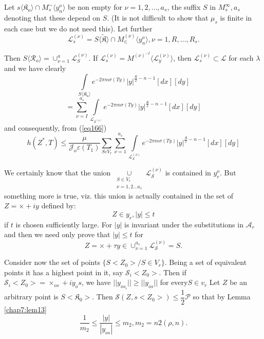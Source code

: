Let $s\langle\mathfrak{K}_o\rangle \cap M^{\sim}_s
\langle y_n^o\rangle$ be non empty for  $\nu = 1, 2, \ldots ,
a_s$, the suffix $S$ in $M_s^{\infty}, a_s$ denoting that these depend
on $S$. (It is not difficult to show that $\mu_s$ is finite in each
case but we do not need this). Let further 
$$
\mathscr{L}_s^{(\nu)} = S \langle \tilde{\mathfrak{K}} \rangle \cap
M_\in^{(\nu)} \langle y_n^o \rangle, \nu = 1, R, \ldots , R_s. 
$$

Then $S \langle \mathscr{R}_o \rangle = \cup^{a}_{\nu = 1}
\mathscr{L}^{(\nu)}_S$. If $\mathscr{L}_s^{(\nu)} = M^{(\nu)^{-I}}
\langle \mathscr{L}_y^{(\nu)}\rangle$, then $\mathscr{L}^{(\nu)}_s
\subset \mathscr{L}$ for each $\lambda$ and we have clearly 
$$
\int\limits_{S\langle \mathfrak{K}_o \rangle} e^{-2 \pi m \sigma (Ty)}
|y|^{\frac{\mathfrak{K}}{2}-n-1} [dx][dy] 
$$
$$
= \sum_{\nu = I }^{a_s} \int\limits_{\mathscr{L}_{\mathscr{S}^{(\nu)}}}
e^{-2 \pi m \sigma (Ty)} |y|^{\frac{\mathfrak{K}}{2}-n-1} [dx][dy] 
$$\pageoriginale 
and consequently, from (\ref{eq166})
\begin{equation*}
h (Z^*, T) \le \frac{\mu}{\mathcal{J}_o \varepsilon(T_1)} \sum_{S
  \varepsilon V_r} \sum_{\nu = 1}^{a_s}
\int\limits_{\mathscr{L}_{\mathscr{S}}^{(\nu)}} e^{-2 \pi m \sigma (Ty)}
|y|^{\frac{\mathfrak{K}}{2}-n-1} [dx][dy] \tag{167}\label{eq167} 
\end{equation*}

We certainly know that the union $\underset{\substack{ S \in V_r
    \\ \nu = 1,2 \ldots a_s}}{\cup} \mathscr{L}_{\mathscr{S}}^{(\nu)}$
is contained in $y_r^o$. But something more is true, viz. this
union is actually contained in the set of $Z = \times + i y$ defined
by: 
$$
Z \in y_r, |y| \le t
$$
if $t$ is chosen sufficiently large. For $|y|$ is invariant under the
substitutions in $\mathscr{A}_r$ and then we need only prove that
$|y|\le t$ for  
$$
Z = \times + \tau y \in \cup_{\nu = 1}^{a_s}
\mathscr{L}_{\mathscr{S}}^{(\nu)} = S.  
$$

Consider now the set of points $\{S<Z_0>/ S \in V_r\}$.  Being a set
of equivalent points it has a highest point in it, say  $\mathscr{S}_i
<Z_0>$. 
 Then if $\mathscr{S}_i <Z_0> = \times _{os}+ i y_os $, we have $ ||
 y_{{os}_{i}}|| \geq ||y_{os}|| $ for every$ S \in v_r$ Let $Z$ be an
 arbitrary point is $S<\mathfrak{K}_0>$. 
 Then $\mathscr{S}(Z,s<Z_0>) \leq \dfrac{1}{2}  \mathcal{P}$ so that
 by Lemma \ref{chap7:lem13} 
 $$
 \frac{1}{m_2} \leq \frac{|y|}{|y_{os}|} \leq m_2, m_2 = n2 (\rho ,n) .
 $$ 
 
